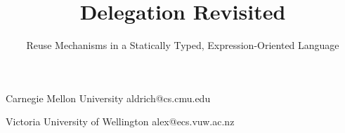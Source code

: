 \documentclass[preprint,10pt]{sigplanconf}
\begin{document}
\setlength{\pdfpageheight}{\paperheight}
\setlength{\pdfpagewidth}{\paperwidth}




\title{Delegation Revisited}
\subtitle{Reuse Mechanisms in a Statically Typed, Expression-Oriented Language}

           {Carnegie Mellon University}
           {aldrich@cs.cmu.edu}

           {Victoria University of Wellington}
           {alex@ecs.vuw.ac.nz}
		   		   
\maketitle

%

\end{document}

